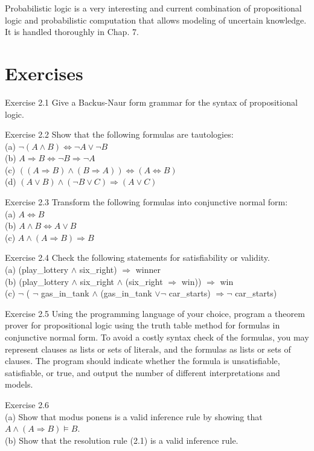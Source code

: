 \documentclass[10pt]{book}
\begin{document}
Probabilistic logic is a very interesting and current combination of propositional logic and probabilistic computation that allows modeling of uncertain knowledge. It is handled thoroughly in Chap. 7.

\section{Exercises}
Exercise 2.1 Give a Backus-Naur form grammar for the syntax of propositional logic.

Exercise 2.2 Show that the following formulas are tautologies:\\
(a) $\neg(A \wedge B) \Leftrightarrow \neg A \vee \neg B$\\
(b) $A \Rightarrow B \Leftrightarrow \neg B \Rightarrow \neg A$\\
(c) $((A \Rightarrow B) \wedge(B \Rightarrow A)) \Leftrightarrow(A \Leftrightarrow B)$\\
(d) $(A \vee B) \wedge(\neg B \vee C) \Rightarrow(A \vee C)$

Exercise 2.3 Transform the following formulas into conjunctive normal form:\\
(a) $A \Leftrightarrow B$\\
(b) $A \wedge B \Leftrightarrow A \vee B$\\
(c) $A \wedge(A \Rightarrow B) \Rightarrow B$

Exercise 2.4 Check the following statements for satisfiability or validity.\\
(a) (play\_lottery $\wedge$ six\_right) $\Rightarrow$ winner\\
(b) (play\_lottery $\wedge$ six\_right $\wedge$ (six\_right $\Rightarrow$ win)) $\Rightarrow$ win\\
(c) $\neg$ ( $\neg$ gas\_in\_tank $\wedge$ (gas\_in\_tank $\vee \neg$ car\_starts) $\Rightarrow \neg$ car\_starts)

Exercise 2.5 Using the programming language of your choice, program a theorem prover for propositional logic using the truth table method for formulas in conjunctive normal form. To avoid a costly syntax check of the formulas, you may represent clauses as lists or sets of literals, and the formulas as lists or sets of clauses. The program should indicate whether the formula is unsatisfiable, satisfiable, or true, and output the number of different interpretations and models.

Exercise 2.6\\
(a) Show that modus ponens is a valid inference rule by showing that $A \wedge(A \Rightarrow B) \models B$.\\
(b) Show that the resolution rule (2.1) is a valid inference rule.
\end{document}
